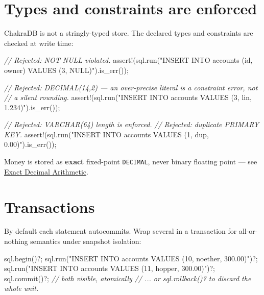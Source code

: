 \documentclass[
  11pt,
  openany]{book}
\newenvironment{Shaded}{}{}
\newcommand{\CommentTok}[1]{\textcolor[rgb]{0.38,0.63,0.69}{\textit{#1}}}
\newcommand{\NormalTok}[1]{#1}
\newcommand{\OperatorTok}[1]{\textcolor[rgb]{0.40,0.40,0.40}{#1}}
\newcommand{\PreprocessorTok}[1]{\textcolor[rgb]{0.74,0.48,0.00}{#1}}
\newcommand{\StringTok}[1]{\textcolor[rgb]{0.25,0.44,0.63}{#1}}
\begin{document}
\section{Types and constraints are
enforced}\label{types-and-constraints-are-enforced}

ChakraDB is not a stringly-typed store. The declared types and
constraints are checked at write time:

\begin{Shaded}
\begin{Highlighting}[]
\CommentTok{// Rejected: NOT NULL violated.}
\PreprocessorTok{assert!}\NormalTok{(sql}\OperatorTok{.}\NormalTok{run(}\StringTok{"INSERT INTO accounts (id, owner) VALUES (3, NULL)"}\NormalTok{)}\OperatorTok{.}\NormalTok{is\_err())}\OperatorTok{;}

\CommentTok{// Rejected: DECIMAL(14,2) — an over{-}precise literal is a constraint error, not}
\CommentTok{// a silent rounding.}
\PreprocessorTok{assert!}\NormalTok{(sql}\OperatorTok{.}\NormalTok{run(}\StringTok{"INSERT INTO accounts VALUES (3, \textquotesingle{}lin\textquotesingle{}, 1.234)"}\NormalTok{)}\OperatorTok{.}\NormalTok{is\_err())}\OperatorTok{;}

\CommentTok{// Rejected: VARCHAR(64) length is enforced.}
\CommentTok{// Rejected: duplicate PRIMARY KEY.}
\PreprocessorTok{assert!}\NormalTok{(sql}\OperatorTok{.}\NormalTok{run(}\StringTok{"INSERT INTO accounts VALUES (1, \textquotesingle{}dup\textquotesingle{}, 0.00)"}\NormalTok{)}\OperatorTok{.}\NormalTok{is\_err())}\OperatorTok{;}
\end{Highlighting}
\end{Shaded}

Money is stored as \textbf{exact} fixed-point \texttt{DECIMAL}, never
binary floating point --- see \href{../engine/data-types.md}{Exact
Decimal Arithmetic}.

\section{Transactions}\label{transactions-1}

By default each statement autocommits. Wrap several in a transaction for
all-or-nothing semantics under snapshot isolation:

\begin{Shaded}
\begin{Highlighting}[]
\NormalTok{sql}\OperatorTok{.}\NormalTok{begin()}\OperatorTok{?;}
\NormalTok{sql}\OperatorTok{.}\NormalTok{run(}\StringTok{"INSERT INTO accounts VALUES (10, \textquotesingle{}noether\textquotesingle{}, 300.00)"}\NormalTok{)}\OperatorTok{?;}
\NormalTok{sql}\OperatorTok{.}\NormalTok{run(}\StringTok{"INSERT INTO accounts VALUES (11, \textquotesingle{}hopper\textquotesingle{}, 300.00)"}\NormalTok{)}\OperatorTok{?;}
\NormalTok{sql}\OperatorTok{.}\NormalTok{commit()}\OperatorTok{?;}                       \CommentTok{// both visible, atomically}
\CommentTok{// ... or sql.rollback()? to discard the whole unit.}
\end{Highlighting}
\end{Shaded}
\end{document}
